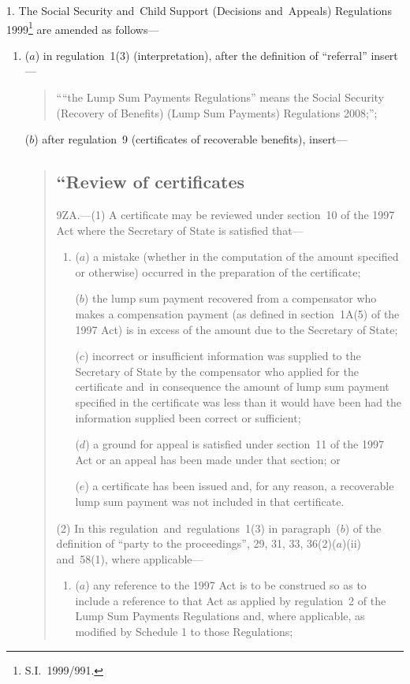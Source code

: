 \documentclass[12pt,a4paper]{article}
\begin{document}
1.  The Social Security and~Child Support (Decisions and~Appeals) Regulations 1999\footnote{S.I.~1999/991.} are amended as follows—
\begin{enumerate}\item[]
($a$) in regulation~1(3) (interpretation), after the definition of “referral” insert—
\begin{quotation}
““the Lump Sum Payments Regulations” means the Social Security (Recovery of Benefits) (Lump Sum Payments) Regulations 2008;”;
\end{quotation}

($b$) after regulation~9 (certificates of recoverable benefits), insert—
\begin{quotation}
\subsection*{“Review of certificates}

9ZA.---(1)  A certificate may be reviewed under section~10 of the 1997 Act where the Secretary of State is satisfied that—
\begin{enumerate}\item[]
($a$) a mistake (whether in the computation of the amount specified or otherwise) occurred in the preparation of the certificate;

($b$) the lump sum payment recovered from a compensator who makes a compensation payment (as defined in section~1A(5) of the 1997 Act) is in excess of the amount due to the Secretary of State;

($c$) incorrect or insufficient information was supplied to the Secretary of State by the compensator who applied for the certificate and~in consequence the amount of lump sum payment specified in the certificate was less than it would have been had the information supplied been correct or sufficient;

($d$) a ground for appeal is satisfied under section~11 of the 1997 Act or an appeal has been made under that section; or

($e$) a certificate has been issued and, for any reason, a recoverable lump sum payment was not included in that certificate.
\end{enumerate}

(2) In this regulation~and~regulations~1(3) in paragraph~($b$)  of the definition of “party to the proceedings”, 29, 31, 33, 36(2)($a$)(ii)  and~58(1), where applicable—
\begin{enumerate}\item[]
($a$) any reference to the 1997 Act is to be construed so as to include a reference to that Act as applied by regulation~2 of the Lump Sum Payments Regulations and, where applicable, as modified by Schedule 1 to those Regulations;


\end{enumerate}
\end{quotation}
\end{enumerate}
\end{document}
